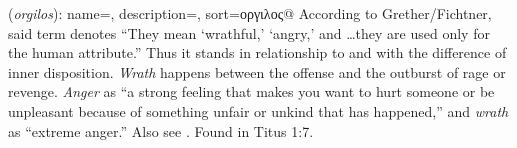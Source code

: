\item[Wrath,]

(\textit{orgilos}):
{
    name=,
    description={},
    sort=οργιλος@
}
According to Grether/Fichtner, said term denotes ``They mean `wrathful,' `angry,' and \ldots they are used only for the human attribute.''
Thus it stands in relationship to  and  with the difference of inner disposition. \emph{Wrath} happens between the offense and the outburst of rage or revenge. \emph{Anger} as ``a strong feeling that makes you want to hurt someone or be unpleasant because of something unfair or unkind that has happened,'' and \emph{wrath} as ``extreme anger.'' Also see .
Found in Titus 1:7.
